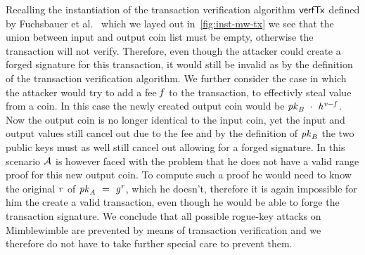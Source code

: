 Recalling the instantiation of the transaction verification algorithm $\mathsf{verfTx}$ defined by Fuchsbauer et al.~\cite{fuchsbauer2019aggregate} which we layed out in~\cref{fig:inst-mw-tx} we see that the union between input and output coin list must be empty, otherwise the transaction will not verify.
Therefore, even though the attacker could create a forged signature for this transaction, it would still be invalid as by the definition of the transaction verification algorithm.
We further consider the case in which the attacker would try to add a fee $\mathit{f}$ to the transaction, to effectivly steal value from a coin.
In this case the newly created output coin would be $\mathit{pk}_{\mathit{B}} ~\cdot~ \mathit{h}^{\mathit{v} - \mathit{f}}$.
Now the output coin is no longer identical to the input coin, yet the input and output values still cancel out due to the fee and by the definition of $\mathit{pk}_{\mathit{B}}$ the two public keys must as well still cancel out allowing for a forged signature.
In this scenario $\mathcal{A}$ is however faced with the problem that he does not have a valid range proof for this new output coin.
To compute such a proof he would need to know the original $\mathit{r}$ of $\mathit{pk}_{\mathit{A}} ~=~ \mathit{g}^{\mathit{r}}$, which he doesn't, therefore it is again impossible for him the create a valid transaction, even though he would be able to forge the transaction signature.
We conclude that all possible rogue-key attacks on Mimblewimble are prevented by means of transaction verification and we therefore do not have to take further special care to prevent them.



